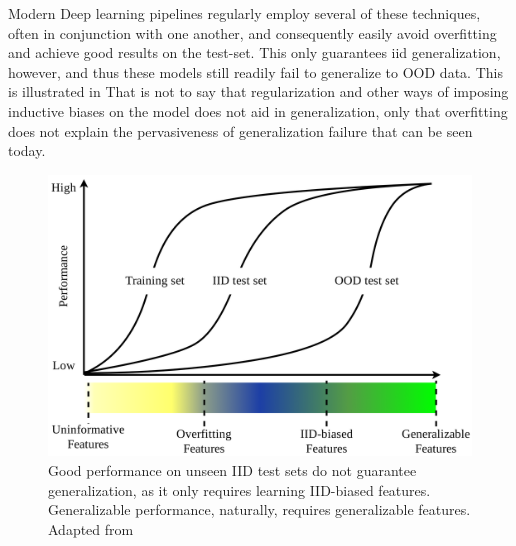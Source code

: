 	Modern Deep learning pipelines regularly employ several of these techniques, often in conjunction with one another, and consequently easily avoid overfitting and achieve good results on the test-set. This only guarantees \gls{iid} generalization, however, and thus these models still readily fail to generalize to OOD data. This is illustrated in  That is not to say that regularization and other ways of imposing inductive biases on the model does not aid in generalization, only that overfitting does not explain the pervasiveness of generalization failure that can be seen today. 
	\begin{figure}
	    \centering
	    \includegraphics[width=\linewidth]{illustrations/features.png}
	    \caption[Feature Taxonomy]{Good performance on unseen IID test sets do not guarantee generalization, as it only requires learning IID-biased features. Generalizable performance, naturally, requires generalizable features. Adapted from \cite{shortcut_learning}}
	    \label{fig:feature_types}
	\end{figure}

